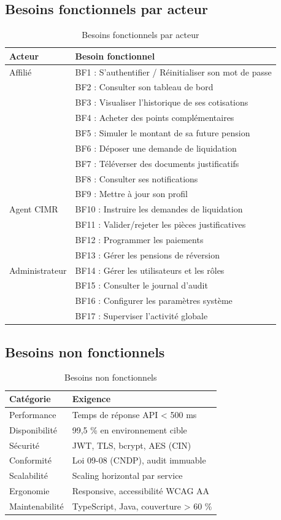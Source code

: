 \documentclass[12pt,a4paper,oneside]{report}
\begin{document}
\subsection{Besoins fonctionnels par acteur}
\begin{longtable}{p{3cm}p{10cm}}
\caption{Besoins fonctionnels par acteur}\\
\toprule
\textbf{Acteur} & \textbf{Besoin fonctionnel} \\
\midrule
\endhead
Affilié & BF1 : S'authentifier / Réinitialiser son mot de passe \\
 & BF2 : Consulter son tableau de bord \\
 & BF3 : Visualiser l'historique de ses cotisations \\
 & BF4 : Acheter des points complémentaires \\
 & BF5 : Simuler le montant de sa future pension \\
 & BF6 : Déposer une demande de liquidation \\
 & BF7 : Téléverser des documents justificatifs \\
 & BF8 : Consulter ses notifications \\
 & BF9 : Mettre à jour son profil \\
Agent CIMR & BF10 : Instruire les demandes de liquidation \\
 & BF11 : Valider/rejeter les pièces justificatives \\
 & BF12 : Programmer les paiements \\
 & BF13 : Gérer les pensions de réversion \\
Administrateur & BF14 : Gérer les utilisateurs et les rôles \\
 & BF15 : Consulter le journal d'audit \\
 & BF16 : Configurer les paramètres système \\
 & BF17 : Superviser l'activité globale \\
\bottomrule
\end{longtable}

\subsection{Besoins non fonctionnels}
\begin{table}[H]
\centering
\caption{Besoins non fonctionnels}
\begin{tabular}{p{3cm}p{10cm}}
\toprule
\textbf{Catégorie} & \textbf{Exigence} \\
\midrule
Performance & Temps de réponse API \textless{} 500 ms \\
Disponibilité & 99,5 \% en environnement cible \\
Sécurité & JWT, TLS, bcrypt, AES (CIN) \\
Conformité & Loi 09-08 (CNDP), audit immuable \\
Scalabilité & Scaling horizontal par service \\
Ergonomie & Responsive, accessibilité WCAG AA \\
Maintenabilité & TypeScript, Java, couverture \textgreater{} 60 \% \\
\bottomrule
\end{tabular}
\end{table}
\end{document}
